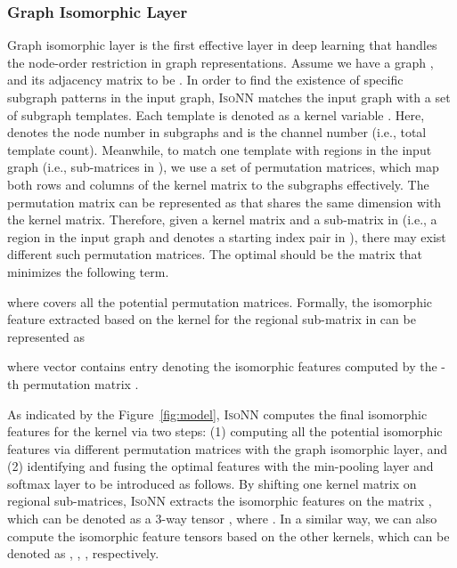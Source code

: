 \documentclass{article} \usepackage{iclr2020_conference,times}
\newcommand{\our}{\textsc{IsoNN}}
\begin{document}
\vspace*{-5pt}
\subsubsection{Graph Isomorphic Layer}
\vspace*{-5pt}
Graph isomorphic layer is the first effective layer in deep learning that handles the node-order restriction in graph representations. Assume we have a graph , and its adjacency matrix to be . In order to find the existence of specific subgraph patterns in the input graph, {\our} matches the input graph with a set of subgraph templates. Each template is denoted as a kernel variable . Here,  denotes the node number in subgraphs and  is the channel number (i.e., total template count). Meanwhile, to match one template with regions in the input graph (i.e., sub-matrices in ), we use  a set of permutation matrices, which map both rows and columns of the kernel matrix to the subgraphs effectively. The permutation matrix can be represented as  that shares the same dimension with the kernel matrix. Therefore, given a kernel matrix  and a sub-matrix  in  (i.e., a region in the input graph  and  denotes a starting index pair in ), there may exist  different such permutation matrices. The optimal should be the matrix  that minimizes the following term.
\vspace*{-5pt}

where  covers all the potential permutation matrices. Formally, the isomorphic feature extracted based on the kernel  for the regional sub-matrix  in  can be represented as
\vspace*{-10pt}

where vector  contains entry  denoting the isomorphic features computed by the -th permutation matrix . 

As indicated by the Figure~\ref{fig:model}, {\our} computes the final isomorphic features for the kernel  via two steps: (1) computing all the potential isomorphic features via different permutation matrices with the graph isomorphic layer, and (2) identifying and fusing the optimal features with the min-pooling layer and softmax layer to be introduced as follows. By shifting one kernel matrix  on regional sub-matrices, {\our} extracts the isomorphic features on the matrix , which can  be denoted as a 3-way tensor , where . In a similar way, we can also compute the isomorphic feature tensors based on the other kernels, which can be denoted as , , ,  respectively. 
\vspace*{-5pt}
\end{document}
